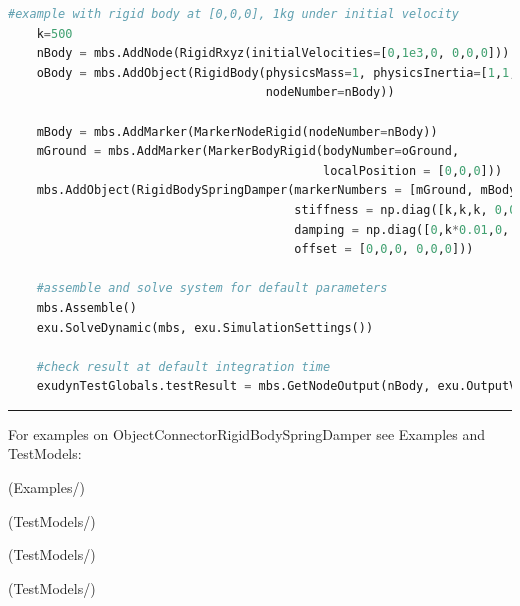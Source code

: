 \begin{lstlisting}[language=Python, firstnumber=1]
    #example with rigid body at [0,0,0], 1kg under initial velocity
    k=500
    nBody = mbs.AddNode(RigidRxyz(initialVelocities=[0,1e3,0, 0,0,0]))
    oBody = mbs.AddObject(RigidBody(physicsMass=1, physicsInertia=[1,1,1,0,0,0], 
                                    nodeNumber=nBody))
    
    mBody = mbs.AddMarker(MarkerNodeRigid(nodeNumber=nBody))
    mGround = mbs.AddMarker(MarkerBodyRigid(bodyNumber=oGround, 
                                            localPosition = [0,0,0]))
    mbs.AddObject(RigidBodySpringDamper(markerNumbers = [mGround, mBody], 
                                        stiffness = np.diag([k,k,k, 0,0,0]), 
                                        damping = np.diag([0,k*0.01,0, 0,0,0]), 
                                        offset = [0,0,0, 0,0,0]))
    
    #assemble and solve system for default parameters
    mbs.Assemble()
    exu.SolveDynamic(mbs, exu.SimulationSettings())
    
    #check result at default integration time
    exudynTestGlobals.testResult = mbs.GetNodeOutput(nBody, exu.OutputVariableType.Displacement)[1] 

\end{lstlisting}

\vspace{6pt}\par\noindent\rule{\textwidth}{0.4pt}
%
\noindent For examples on ObjectConnectorRigidBodySpringDamper see Examples and TestModels:
\bi
\item {} (Examples/)
\item {} (TestModels/)
\item {} (TestModels/)
\item {} (TestModels/)
\ei

%
\newpage


